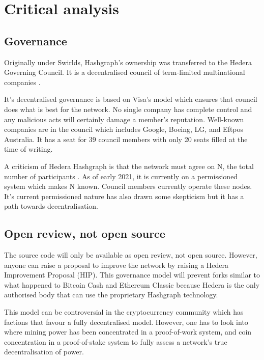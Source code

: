 \section{Critical analysis}

\subsection{Governance}
Originally under Swirlds, Hashgraph's ownership was transferred to the Hedera Governing Council. It is a decentralised council of term-limited multinational companies \cite{baird2018hedera}. 

It's decentralised governance is based on Visa's model\cite{hederacouncil} which ensures that council does what is best for the network. No single company has complete control and any malicious acts will certainly damage a member's reputation. Well-known companies are in the council which includes Google, Boeing, LG, and Eftpos Australia. It has a seat for 39 council members with only 20 seats filled at the time of writing.

A criticism of Hedera Hashgraph is that the network must agree on N, the total number of participants \cite{kauflin2018}. As of early 2021, it is currently on a permissioned system which makes N known. Council members currently operate these nodes. It's current permissioned nature has also drawn some skepticism but it has a path towards decentralisation.


\subsection{Open review, not open source}
The source code will only be available as open review, not open source. However, anyone can raise a proposal to improve the network by raising a Hedera Improvement Proposal (HIP)\cite{hip}. This governance model will prevent forks similar to what happened to Bitcoin Cash and Ethereum Classic because Hedera is the only authorised body that can use the proprietary Hashgraph technology.

This model can be controversial in the cryptocurrency community which has factions that favour a fully decentralised model. However, one has to look into where mining power has been concentrated in a proof-of-work system, and coin concentration in a proof-of-stake system to fully assess a network's true decentralisation of power.

